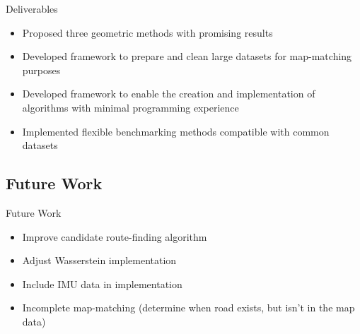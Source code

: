 \documentclass[aspectratio=169, bigfiles, professionalfonts, hyperref={colorlinks=true, allcolors=., urlcolor=blue}]{beamer}
\begin{document}
%
%
%

\begin{frame}{Deliverables}
	
\begin{itemize}
	\item Proposed three geometric methods with promising results
	\item Developed framework to prepare and clean large datasets for map-matching purposes
	\item Developed framework to enable the creation and implementation of algorithms with minimal programming experience
	\item Implemented flexible benchmarking methods compatible with common datasets
\end{itemize}

\end{frame}


\subsection{Future Work}
\begin{frame}{Future Work}
    \begin{itemize}
        \item Improve candidate route-finding algorithm
	\item Adjust Wasserstein implementation
        \item Include IMU data in implementation
        \item Incomplete map-matching (determine when road exists, but isn't in the map data)
    \end{itemize}
\end{frame}
\end{document}
